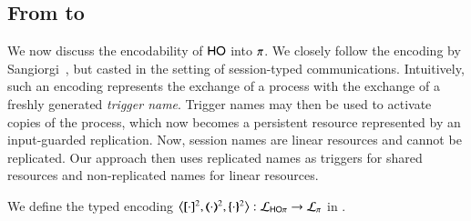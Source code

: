 \subsection{From \HOp to \sessp}
\label{subsec:HOp_to_sessp}
\noi 
We now discuss the encodability of  $\mathsf{HO}$ into $\pi$. %
We closely follow the encoding  by 
Sangiorgi~\cite{San92,SaWabook}, but casted in the setting of session-typed communications. 
Intuitively, such an encoding  represents the exchange of a process with the exchange of a freshly generated \emph{trigger name}. 
Trigger names may then be used to activate copies of the process, which now becomes a persistent resource represented by an input-guarded replication.
Now, session names are linear resources and cannot be replicated.
Our
approach %
then uses replicated names
as triggers for shared resources and non-replicated names
for linear resources.

\smallskip 

\begin{definition}
\label{d:enc:hopitopi}
We define the typed encoding 
$\enco{\map{\cdot}^{2}, \mapt{\cdot}^{2}, \mapa{\cdot}^{2}}: \tyl{L}_{\HOp} \to \tyl{L}_{\sessp}$  
in . 
\end{definition}

